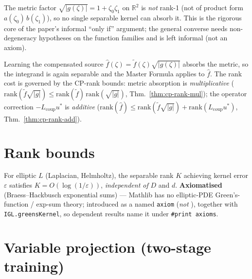 \begin{theorem}\label{thm:barrier-only-if}
  \leanok{}
  The metric factor $\sqrt{|g(\zeta)|}=1+\zeta_0\zeta_1$ on $\mathbb R^2$ is \emph{not} rank-1
  (not of product form $a(\zeta_0)\,b(\zeta_1)$), so no single separable kernel can absorb it.
  This is the rigorous core of the paper's informal ``only if'' argument; the general converse
  needs non-degeneracy hypotheses on the function families and is left informal (not an axiom).
\end{theorem}

\begin{theorem}\label{thm:compensation}
  Learning the compensated source $\hat f(\zeta)=\tilde f(\zeta)\sqrt{|g(\zeta)|}$ absorbs the
  metric, so the integrand is again separable and the Master Formula applies to $\hat f$. The rank
  cost is governed by the CP-rank bounds: metric absorption is \emph{multiplicative}
  ($\mathrm{rank}(\tilde f\sqrt{|g|})\le\mathrm{rank}(\tilde f)\,\mathrm{rank}(\sqrt{|g|})$,
  Thm.~\ref{thm:cp-rank-mul}); the operator correction $-L_{\mathrm{coup}}u^*$ is \emph{additive}
  ($\mathrm{rank}(\hat f)\le\mathrm{rank}(\tilde f\sqrt{|g|})+\mathrm{rank}(L_{\mathrm{coup}}u^*)$,
  Thm.~\ref{thm:cp-rank-add}).
\end{theorem}

\section{Rank bounds}

\begin{proposition}\label{prop:expsum}
  For elliptic $L$ (Laplacian, Helmholtz), the separable rank $K$ achieving kernel error
  $\varepsilon$ satisfies $K=O(\log(1/\varepsilon))$, \emph{independent of} $D$ and $d$.
  \textbf{Axiomatised} (Braess–Hackbusch exponential sums) — Mathlib has no elliptic-PDE
  Green's-function / exp-sum theory; introduced as a named \texttt{axiom} (\emph{not}
  \leanok), together with \texttt{IGL.greensKernel}, so dependent results name it under
  \texttt{\#print axioms}.
\end{proposition}

\section{Variable projection (two-stage training)}

